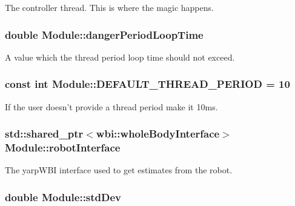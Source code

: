 \-The controller thread. \-This is where the magic happens. \hypertarget{classModule_a33fee1e7f977b4f27a2e1488480996fb}{
\subsubsection[{danger\-Period\-Loop\-Time}]{\setlength{\rightskip}{0pt plus 5cm}double {\bf \-Module\-::danger\-Period\-Loop\-Time}}}\label{classModule_a33fee1e7f977b4f27a2e1488480996fb}
\-A value which the thread period loop time should not exceed. \hypertarget{classModule_af73cdfdae53c52ea8488d0d8c4f9083f}{
\subsubsection[{\-D\-E\-F\-A\-U\-L\-T\-\_\-\-T\-H\-R\-E\-A\-D\-\_\-\-P\-E\-R\-I\-O\-D}]{\setlength{\rightskip}{0pt plus 5cm}const int {\bf \-Module\-::\-D\-E\-F\-A\-U\-L\-T\-\_\-\-T\-H\-R\-E\-A\-D\-\_\-\-P\-E\-R\-I\-O\-D} = 10}}\label{classModule_af73cdfdae53c52ea8488d0d8c4f9083f}
\-If the user doesn't provide a thread period make it 10ms. \hypertarget{classModule_a0d3efedabcef6ec0db88011ccc2e7205}{
\subsubsection[{robot\-Interface}]{\setlength{\rightskip}{0pt plus 5cm}std\-::shared\-\_\-ptr$<$wbi\-::whole\-Body\-Interface$>$ {\bf \-Module\-::robot\-Interface}}}\label{classModule_a0d3efedabcef6ec0db88011ccc2e7205}
\-The yarp\-W\-B\-I interface used to get estimates from the robot. \hypertarget{classModule_af66a2dab82208cb2ea25da22fcaaa4a3}{
\subsubsection[{std\-Dev}]{\setlength{\rightskip}{0pt plus 5cm}double {\bf \-Module\-::std\-Dev}}}\label{classModule_af66a2dab82208cb2ea25da22fcaaa4a3}
